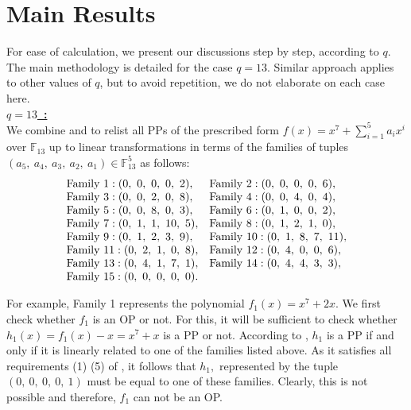 \documentclass[12pt,a4wide, reqno]{amsart}
\theoremstyle{definition}
\theoremstyle{remark}
\numberwithin{equation}{section}
\begin{document}
\section{Main Results}
For ease of calculation, we present our discussions step by step, according to $q.$ The main methodology is detailed for the case $q=13.$ Similar approach applies to other values of $q$, but to avoid repetition, we do not elaborate on each case here.
\vspace{0.5 cm}
\\
\underline{\Large \textbf{$q=13$~:}}
\vspace{0.2cm}
\\
We combine  and  to relist all PPs of the prescribed form $f(x)=x^7+\sum_{i=1}^{5}a_ix^i$ over $\mathbb{F}_{13}$ up to linear transformations in terms of the families of tuples $(a_5,~a_4,~a_3,~a_2,~a_1)\in\mathbb{F}_{13}^5$ as follows:
\begin{equation}
\begin{matrix*}[l]
     \textup{Family 1}:(0,~0,~0,~0,~2), & \textup{Family 2}:(0,~0,~0,~0,~6),\\
     \textup{Family 3}: (0,~0,~2,~0,~8),&\textup{Family 4}:(0,~0,~4,~0,~4), \\
     \textup{Family 5}:(0,~0,~8,~0,~3),& \textup{Family 6}: (0,~1,~0,~0,~2),\\
     \textup{Family 7}:(0,~1,~1,~10,~5),& \textup{Family 8}:(0,~1,~2,~1,~0),\\
 \textup{Family 9}:(0,~1,~2,~3,~9),& \textup{Family 10}:(0,~1,~8,~7,~11),\\
 \textup{Family 11}:(0,~2,~1,~0,~8), & \textup{Family 12}:(0,~4,~0,~0,~6),\\
 \textup{Family 13}:(0,~4,~1,~7,~1),& \textup{Family 14}:(0,~4,~4,~3,~3), \\
 \textup{Family 15}:(0,~0,~0,~0,~0). &  \\
\end{matrix*}
\label{eq1}
\end{equation}

For example, Family 1 represents the polynomial $f_1(x)=x^7+2x.$ We first check whether $f_1$ is an OP or not. For this, it will be sufficient to check whether $h_1(x)=f_1(x)-x=x^7+x$ is a PP or not. According to , $h_1$ is a PP if and only if it is linearly related to one of the families listed above. As it satisfies all requirements (1) \textendash (5) of , it follows that $h_1,$ represented by the tuple $(0,~0,~0,~0,~1)$ must be equal to one of these families. Clearly, this is not possible and therefore, $f_1$ can not be an OP.
\end{document}

